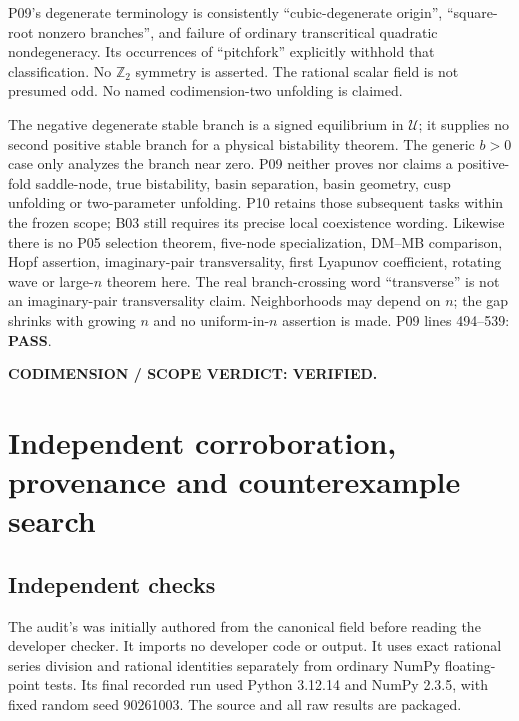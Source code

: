 \documentclass[11pt]{article}
\newcommand{\U}{\mathcal U}
\newcommand{\lin}[1]{P09 lines #1}
\newcommand{\pass}{\textbf{PASS}}
\begin{document}
P09's degenerate terminology is consistently ``cubic-degenerate origin'',
``square-root nonzero branches'', and failure of ordinary transcritical
quadratic nondegeneracy. Its occurrences of ``pitchfork'' explicitly
withhold that classification. No $\mathbb Z_2$ symmetry is asserted.
The rational scalar field is not presumed odd. No named codimension-two
unfolding is claimed.

The negative degenerate stable branch is a signed equilibrium in $\U$;
it supplies no second positive stable branch for a physical bistability
theorem. The generic $b>0$ case only analyzes the branch near zero.
P09 neither proves nor claims a positive-fold saddle-node, true
bistability, basin separation, basin geometry, cusp unfolding or
two-parameter unfolding. P10 retains those subsequent tasks within the
frozen scope; B03 still requires its precise local coexistence wording.
Likewise there is no P05 selection theorem, five-node specialization,
DM--MB comparison, Hopf assertion, imaginary-pair transversality,
first Lyapunov coefficient, rotating wave or large-$n$ theorem here.
The real branch-crossing word ``transverse'' is not an imaginary-pair
transversality claim. Neighborhoods may depend on $n$; the gap shrinks
with growing $n$ and no uniform-in-$n$ assertion is made.
\lin{494--539}: \pass.

\textbf{CODIMENSION / SCOPE VERDICT: VERIFIED.}

\section{Independent corroboration, provenance and counterexample search}
\label{sec:checks}
\subsection{Independent checks}
The audit's  was initially authored
from the canonical field before reading the developer checker. It imports
no developer code or output. It uses exact rational series division and
rational identities separately from ordinary NumPy floating-point tests.
Its final recorded run used Python 3.12.14 and NumPy 2.3.5, with fixed random
seed 90261003. The source and all raw results are packaged.
\end{document}

